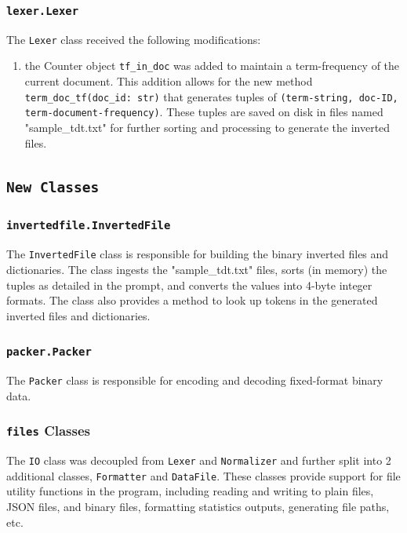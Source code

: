 \documentclass[11pt]{article}
\begin{document}
\subsubsection{\texttt{lexer.Lexer}}
The \texttt{Lexer} class received the following modifications:
\begin{enumerate}
    \item the Counter object \texttt{tf\_in\_doc} was added to maintain a term-frequency of the current document. This addition allows for the new method \texttt{term\_doc\_tf(doc\_id: str)} that generates tuples of \texttt{(term-string, doc-ID, term-document-frequency)}. These tuples are saved on disk in files named "sample\_tdt.txt" for further sorting and processing to generate the inverted files.
\end{enumerate}

\subsection{\texttt{New Classes}}

\subsubsection{\texttt{invertedfile.InvertedFile}}
The \texttt{InvertedFile} class is responsible for building the binary inverted files and dictionaries. The class ingests the "sample\_tdt.txt" files, sorts (in memory) the tuples as detailed in the prompt, and converts the values into 4-byte integer formats. The class also provides a method to look up tokens in the generated inverted files and dictionaries.

\subsubsection{\texttt{packer.Packer}}
The \texttt{Packer} class is responsible for encoding and decoding fixed-format binary data.

\subsubsection{\texttt{files} Classes}
The \texttt{IO} class was decoupled from \texttt{Lexer} and \texttt{Normalizer} and further split into 2 additional classes, \texttt{Formatter} and \texttt{DataFile}. These classes provide support for file utility functions in the program, including reading and writing to plain files, JSON files, and binary files, formatting statistics outputs, generating file paths, etc.
\end{document}
